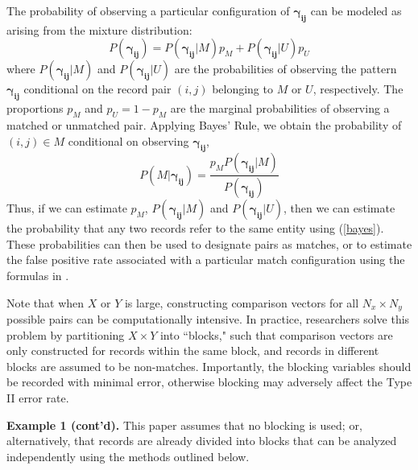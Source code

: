\documentclass[12pt]{article}
\newcommand\gamij{\mathbf{\gamma_{ij}}}
\begin{document}
\begin{enumerate}
The probability of observing a particular configuration of $\gamij$ can be modeled as arising from the mixture distribution:
\begin{equation}
P(\gamij) = P(\gamij | M) p_M + P(\gamij | U) p_U 
\label{mm}
\end{equation}
where $P(\gamij | M)$ and $P(\gamij | U)$ are the probabilities of observing the pattern $\gamij$ conditional on the record pair $(i,j)$ belonging to $M$ or $U$, respectively.  The proportions $p_M$ and $p_U = 1-p_M$ are the marginal probabilities of observing a matched or unmatched pair.  Applying Bayes' Rule, we obtain the probability of $(i,j) \in M$ conditional on observing $\gamij$,
\begin{equation} P(M | \gamij) = \frac{p_M P(\gamij | M)}{P(\gamij)} \label{bayes} \end{equation}
Thus, if we can estimate $p_M$, $P(\gamij | M)$ and $P(\gamij | U)$, then we can estimate the probability that any two records refer to the same entity using (\ref{bayes}).   These probabilities can then be used to designate pairs as matches, or to estimate the false positive rate associated with a particular match configuration using the formulas in \cite{fellegi69}.  

Note that when $X$ or $Y$ is large, constructing comparison vectors for all $N_x\times N_y$ possible pairs can be computationally intensive.   In practice, researchers solve this problem by partitioning $X\times Y$ into ``blocks," such that comparison vectors are only constructed for records within the same block, and records in different blocks are assumed to be non-matches. Importantly, the blocking variables should be recorded with minimal error, otherwise blocking may adversely affect the Type II error rate. 

\textbf{Example 1 (cont'd).} This paper assumes that no blocking is used; or, alternatively, that records are already divided into blocks that can be analyzed independently using the methods outlined below.  


\end{enumerate}
\end{document}
